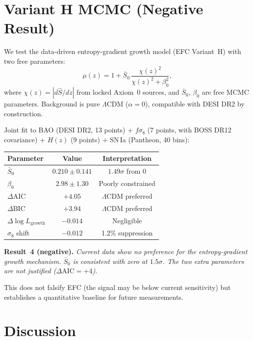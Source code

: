 \documentclass[11pt,a4paper]{article}
\newcommand{\lcdm}{$\Lambda$CDM}
\begin{document}
\section{Variant H MCMC (Negative Result)}

We test the data-driven entropy-gradient growth model
(EFC Variant~H) with two free parameters:
\begin{equation}
\mu(z) = 1 + \bar{S}_0\,\frac{\chi(z)^2}{\chi(z)^2 + \beta_0^2},
\end{equation}
where $\chi(z) = |d\hat{S}/dz|$ from locked Axiom~0 sources, and
$\bar{S}_0$, $\beta_0$ are free MCMC parameters.  Background is
pure \lcdm{} ($\alpha = 0$), compatible with DESI DR2 by construction.

Joint fit to BAO (DESI DR2, 13 points) + $f\sigma_8$ (7 points, with
BOSS DR12 covariance) + $H(z)$ (9 points) + SN\,Ia (Pantheon, 40 bins):

\begin{center}
\begin{tabular}{@{}lcc@{}}
\toprule
Parameter & Value & Interpretation \\
\midrule
$\bar{S}_0$       & $0.210 \pm 0.141$ & $1.49\sigma$ from 0 \\
$\beta_0$          & $2.98 \pm 1.30$   & Poorly constrained \\
$\Delta\mathrm{AIC}$ & $+4.05$ & \lcdm{} preferred \\
$\Delta\mathrm{BIC}$ & $+3.94$ & \lcdm{} preferred \\
$\Delta\log L_{\mathrm{growth}}$ & $-0.014$ & Negligible \\
$\sigma_8$ shift   & $-0.012$ & 1.2\% suppression \\
\bottomrule
\end{tabular}
\end{center}

\textbf{Result~4 (negative).}
\emph{Current data show no preference for the entropy-gradient growth
mechanism.  $\bar{S}_0$ is consistent with zero at $1.5\sigma$.
The two extra parameters are not justified ($\Delta\mathrm{AIC} = +4$).}

This does not falsify EFC (the signal may be below current sensitivity)
but establishes a quantitative baseline for future measurements.

\newpage
\section{Discussion}
\end{document}
